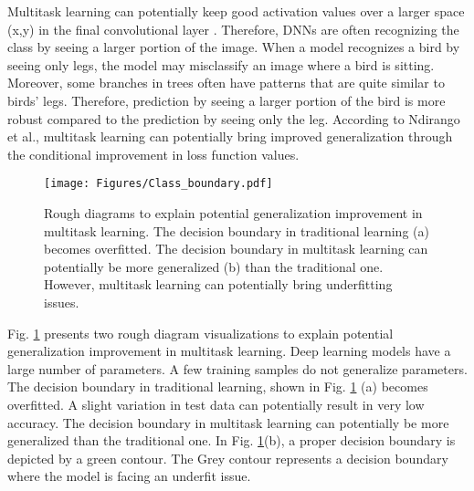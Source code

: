 \documentclass{article}
\begin{document}
Multitask learning can potentially keep good activation values over a larger space (x,y) in the final convolutional layer \cite{kapidis2019multitask}. Therefore, DNNs are often recognizing the class by seeing a larger portion of the image. When a model recognizes a bird by seeing only legs, the model may misclassify an image where a bird is sitting. Moreover, some branches in trees often have patterns that are quite similar to birds' legs. Therefore, prediction by seeing a larger portion of the bird is more robust compared to the prediction by seeing only the leg.
According to Ndirango et al., \cite{ndirango2019generalization} multitask learning can potentially bring improved generalization through the conditional improvement in loss function values.




\begin{figure}[ht]
\vskip 0.2in
\begin{center}
\centerline{\texttt{[image: Figures/Class\_boundary.pdf]}}
\caption{Rough diagrams to explain potential generalization improvement in multitask learning.  The decision boundary in traditional learning (a) becomes overfitted. The decision boundary in multitask learning can potentially be more generalized (b) than the traditional one. However, multitask learning can potentially bring underfitting issues.}
\label{Cluster}
\end{center}
\vskip -0.2in
\end{figure}

Fig. \ref{Cluster} presents two rough diagram visualizations to explain potential generalization improvement in multitask learning. Deep learning models have a large number of parameters. A few training samples do not generalize parameters. The decision boundary in traditional learning, shown in Fig. \ref{Cluster} (a) becomes overfitted. A slight variation in test data can potentially result in very low accuracy. The decision boundary in multitask learning can potentially be more generalized than the traditional one. In Fig. \ref{Cluster}(b), a proper decision boundary is depicted by a green contour. The Grey contour represents a decision boundary where the model is facing an underfit issue.
 
\end{document}
